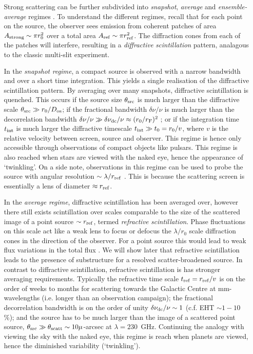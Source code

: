 Strong scattering can be further subdivided into \emph{snapshot}, \emph{average} and \emph{ensemble-average} regimes \citep*{Narayan_1989,Goodman_1989}. To understand the different regimes, recall that for each point on the source, the observer sees emission from coherent patches of area $A_{\rm strong} \sim \pi r_0^2$ over a total area $A_{\rm ref} \sim \pi r_{\rm ref}^2$. The diffraction cones from each of the patches will interfere, resulting in a \emph{diffractive scintillation} pattern, analagous to the classic multi-slit experiment. 

In the \emph{snapshot regime}, a compact source is observed with a narrow bandwidth and over a short time integration. This yields a single realisation of the diffractive scintillation pattern. By averaging over many snapshots, diffractive scintillation is quenched. This occurs if the source size $\theta_{\rm src}$ is much larger than the diffractive scale $\theta_{\rm src} \gg r_0/D_{\rm os}$; if the fractional bandwidth $\delta \nu/\nu$ is much larger than the decorrelation bandwidth $\delta \nu/\nu \gg \delta \nu_{\rm dc}/\nu \approx (r_0/r_{\rm F})^2$ \citep{Narayan_1992}; or if the integration time $t_{\rm int}$ is much larger the diffractive timescale $t_{\rm int} \gg t_{\rm 0} = r_0/v$, where $v$ is the relative velocity between screen, source and observer. This regime is hence only accessible through observations of compact objects like pulsars. This regime is also reached when stars are viewed with the naked eye, hence the appearance of `twinkling'. On a side note, observations in this regime can be used to probe the source with angular resolution $\sim \lambda /r_{\rm ref}$ \citep[e.g.][]{Gwinn_2012}. This is because the scattering screen is essentially a lens of diameter $\approx r_{\rm ref}$.

In the \emph{average regime}, diffractive scintillation has been averaged over, however there still exists scintillation over scales comparable to the size of the scattered image of a point source $\sim r_{\rm ref}$, termed \emph{refractive scintillation}. Phase fluctuations on this scale act like a weak lens to focus or defocus the $\lambda/ r_0$ scale diffraction cones in the direction of the observer. For a point source this would lead to weak flux variations in the total flux \citep{Narayan_1992}. We will show later that refractive scintillation leads to the presence of substructure for a resolved scatter-broadened source. In contrast to diffractive scintillation, refractive scintillation is has stronger averaging requirements. Typically the refractive time scale $t_{\rm ref} = r_{\rm ref}/v$ is on the order of weeks to months for scattering towards the Galactic Centre at mm-wavelengths (i.e. longer than an observation campaign); the fractional decorrelation bandwidth is on the order of unity $\delta \nu_{\rm dc}/\nu \sim 1$ (c.f. EHT $\sim 1-10$\%); and the source has to be much larger than the image of a scattered point source, $\theta_{\rm src} \gg \theta_{\rm scatt} \sim 10 \mu$-arcsec at $\lambda = 230$~GHz. Continuing the analogy with viewing the sky with the naked eye, this regime is reach when planets are viewed, hence the diminished variability (`twinkling'). 

